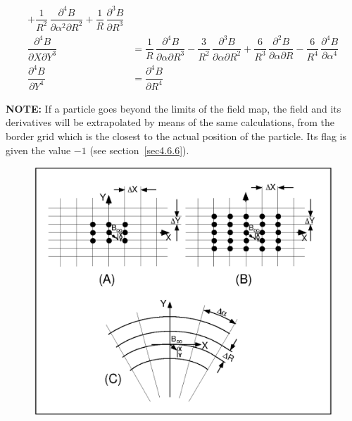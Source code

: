 {\begin{equation}
\begin{array}{ll}
	           + \dfrac{1 }{ R^2} \, \dfrac{\partial^4 B }{ \partial \alpha^2\partial R^2} 
	           + \dfrac{1 }{ R} \, \dfrac{\partial^3 B }{ \partial R^3}\\     %
	     \dfrac{ \partial^4 B }{ \partial X\partial Y^3} 
	         & = \dfrac{ 1 }{ R} \, \dfrac{\partial^4 B }{\partial \alpha \partial R^3} 
	           - \dfrac{3 }{ R^2} \, \dfrac{\partial^3 B }{ \partial \alpha \partial R^2} 
	           + \dfrac{6 }{ R^3} \, \dfrac{\partial^2 B }{ \partial \alpha\partial R} 
	           - \dfrac{6 }{ R^4} \, \dfrac{\partial^4 B }{ \partial \alpha^ 4} \\  %
	     \dfrac{ \partial^4 B }{ \partial Y^4}
	         & =   \dfrac{ \partial^4 B }{ \partial R^4}
	 \end{array} 
	\label{eq2-4-9}
\end{equation}  }
 

\noindent \textbf{NOTE:} If a particle goes beyond the limits of the 
 field map, the field and its derivatives will be extrapolated by means of the same calculations, 
from the border grid which is the closest to the actual position of the 
particle. Its flag \IEX{} is given the value $-1$ (see section~\ref{sec4.6.6}). 


\begin{figure}[H]  %
\centerline{\includegraphics[width=15.5cm]{Fig3.ps}}
	\end{figure}

